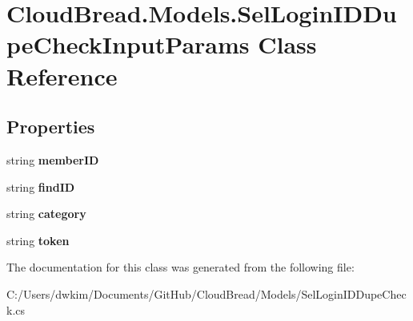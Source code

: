 \hypertarget{a00094}{}\section{Cloud\+Bread.\+Models.\+Sel\+Login\+I\+D\+Dupe\+Check\+Input\+Params Class Reference}
\label{a00094}
\subsection*{Properties}
\begin{DoxyCompactItemize}
\item 
string {\bfseries member\+ID}\hypertarget{a00094_a89c849515b86088797c94b718921f6cb}{}\label{a00094_a89c849515b86088797c94b718921f6cb}

\item 
string {\bfseries find\+ID}\hypertarget{a00094_a7422264c72a0228889aa86ea2c081365}{}\label{a00094_a7422264c72a0228889aa86ea2c081365}

\item 
string {\bfseries category}\hypertarget{a00094_a5cb9677a7d26c3f9e36567e1b9be5a6a}{}\label{a00094_a5cb9677a7d26c3f9e36567e1b9be5a6a}

\item 
string {\bfseries token}\hypertarget{a00094_a26ed096e8f3fcdfdded87c93dbeaffcc}{}\label{a00094_a26ed096e8f3fcdfdded87c93dbeaffcc}

\end{DoxyCompactItemize}


The documentation for this class was generated from the following file\+:\begin{DoxyCompactItemize}
\item 
C\+:/\+Users/dwkim/\+Documents/\+Git\+Hub/\+Cloud\+Bread/\+Models/Sel\+Login\+I\+D\+Dupe\+Check.\+cs\end{DoxyCompactItemize}

